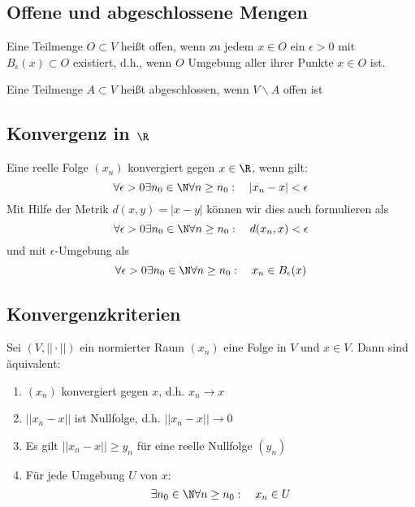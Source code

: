 	\subsection{Offene und abgeschlossene Mengen}
		\begin{Definition} [ ]
			Eine Teilmenge $O\subset V$ heißt offen, wenn zu jedem $x\in O$ ein $\epsilon>0$ mit $B_\epsilon(x)\subset O$ existiert, d.h., wenn $O$ Umgebung aller ihrer Punkte $x\in O$ ist.
		\end{Definition}
		\begin{Definition} [ ]
			Eine Teilmenge $A\subset V$ heißt abgeschlossen, wenn $V\backslash A$ offen ist
		\end{Definition}
	\subsection{Konvergenz in $\R$}
		\begin{Definition} [ ]
			Eine reelle Folge $(x_n)$ konvergiert gegen $x\in\R$, wenn gilt:
			$$
				\forall \epsilon > 0 \exists n_0 \in \N \forall n \geq n_0: \quad |x_n - x| < \epsilon
			$$
			Mit Hilfe der Metrik $d(x, y) = |x-y|$ können wir dies auch formulieren als
			$$
				\forall \epsilon > 0 \exists n_0 \in \N \forall n \geq n_0: \quad d(x_n, x) < \epsilon
			$$
			und mit $\epsilon$-Umgebung als
			$$
				\forall \epsilon > 0 \exists n_0 \in \N \forall n \geq n_0: \quad x_n \in B_\epsilon(x)
			$$
		\end{Definition}
	\subsection{Konvergenzkriterien}
		\begin{Lemma} [ ]
			Sei $(V, ||\cdot||)$ ein normierter Raum $(x_n)$ eine Folge in $V$ und $x \in V$. \newline
			Dann sind äquivalent:
			\begin{enumerate}
				\item $(x_n)$ konvergiert gegen $x$, d.h. $x_n\to x$
				\item $||x_n - x||$ ist Nullfolge, d.h. $||x_n - x||\to 0$
				\item Es gilt $||x_n - x||\geq y_n$ für eine reelle Nullfolge $(y_n)$
				\item Für jede Umgebung $U$ von $x$:
					$$
						\exists n_0 \in \N \forall n \geq n_0: \quad x_n \in U
					$$
			\end{enumerate}
		\end{Lemma}
